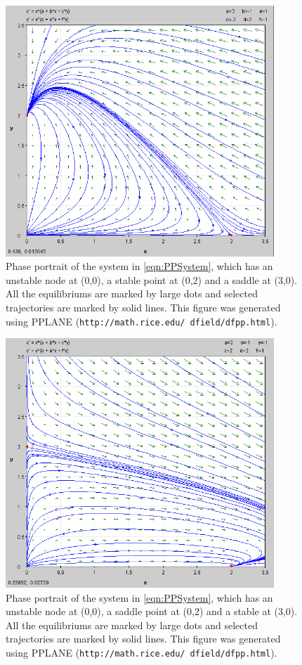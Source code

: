\documentclass[a4paper,twocolumn]{article} %
\begin{document}
\begin{figure}[p] %
  \begin{center}
    \includegraphics[width = 0.9\textwidth, height = 0.5\textwidth]{-21}
  \end{center}
  \caption{Phase portrait of the system in \eqref{eqn:PPSystem}, which has an unstable node at \mbox{(0,0)}, a stable point at \mbox{(0,2)} and a saddle at \mbox{(3,0)}. All the equilibriums are marked by large dots and selected trajectories are marked by solid lines. This figure was generated using PPLANE (\texttt{http://math.rice.edu/~dfield/dfpp.html}).}
  \label{fig:pplane2}
\end{figure}

\begin{figure}[p] %
  \begin{center}
    \includegraphics[width = 0.9\textwidth, height = 0.5\textwidth]{2-1}
  \end{center}
  \caption{Phase portrait of the system in \eqref{eqn:PPSystem}, which has an unstable node at \mbox{(0,0)}, a saddle point at \mbox{(0,2)} and a stable at \mbox{(3,0)}. All the equilibriums are marked by large dots and selected trajectories are marked by solid lines. This figure was generated using PPLANE (\texttt{http://math.rice.edu/~dfield/dfpp.html}).}
  \label{fig:pplane2}
\end{figure}
\end{document}
